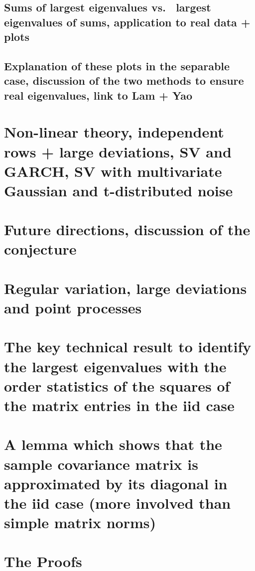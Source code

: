 \documentclass[11pt,reqno]{amsart}
\newcommand{\1}{\mathds{1}}
\newcommand{\0}{\boldsymbol{0}}
\newcommand{\4}{\mathchoice{\mskip1.5mu}{\mskip1.5mu}{}{}}
\newcommand{\5}{\mathchoice{\mskip-1.5mu}{\mskip-1.5mu}{}{}}
\newcommand{\2}{\penalty250\mskip\thickmuskip\mskip-\thinmuskip} %
\begin{document}
\subsection{Sums of largest eigenvalues vs.~ largest eigenvalues of
  sums, application to real data + plots}
\subsection{Explanation of these plots in the separable case,
  discussion of the two methods to ensure real eigenvalues, link to
  Lam + Yao}

\section{Non-linear theory, independent rows + large deviations, SV
  and GARCH, SV with multivariate Gaussian and t-distributed noise}
\section{Future directions, discussion of the conjecture}


\appendix 
\section{Regular variation, large deviations and point processes}
\section{The key technical result to identify the largest eigenvalues
  with the order statistics of the squares of the matrix entries in
  the iid case}
\section{A lemma which shows that the sample covariance matrix is
  approximated by its diagonal in the iid case (more involved than
  simple matrix norms)}
\section{The Proofs}
\end{document}
